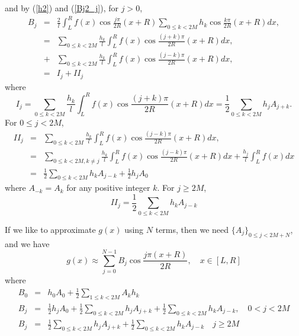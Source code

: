 \documentclass[numreferences]{kluwer}    %
\begin{document}
\begin{article}
and by (\ref{h2}) and (\ref{Bj2_j}), for $j>0$,
\begin{eqnarray}
B_j&=& \frac{2}l\int^{R}_L f(x)\cos\frac{j\pi}{2R}(x+R)  \sum_{0\le k<2M} h_k\cos \frac{k\pi}{2R}(x+R)   dx, \nonumber\\
&=& \sum_{0\le k<2M}  \frac{h_k}l\int^{R}_L f(x)\cos\frac{(j+k)\pi}{2R} (x+R)  dx, \nonumber\\
&+& \sum_{0\le k<2M}  \frac{h_k}l\int^{R}_L f(x)\cos\frac{(j-k)\pi}{2R} (x+R)  dx, \nonumber\\
&=& I_j + II_j
\end{eqnarray}
where
\begin{equation}
	I_j =\sum_{0\le k<2M}  \frac{h_k}l\int^{R}_L f(x)\cos\frac{(j+k)\pi}{2R} (x+R)  dx = \frac12\sum_{0\le k<2M} h_jA_{j+k}.
\end{equation}
For $0\le j<2M$, 
\begin{eqnarray}
	II_j &=& \sum_{0\le k<2M}  \frac{h_k}l\int^{R}_L f(x)\cos\frac{(j-k)\pi}{2R} (x+R)  dx, \nonumber\\
	&=& \sum_{0\le k<2M, k\neq j}  \frac{h_k}l\int^{R}_L f(x)\cos\frac{(j-k)\pi}{2R} (x+R)  dx + 
	\frac{h_j}l\int^{R}_L f(x) dx  \nonumber\\
	&=& \frac12 \sum_{0\le k<2M} h_kA_{j-k} + \frac12 h_jA_0 
\end{eqnarray}
 where $A_{-k}=A_k$ for any positive integer $k$. For $j\ge 2M$,
 \begin{equation}
 	II_j = \frac12 \sum_{0\le k<2M} h_kA_{j-k} 
 \end{equation}
 
If we like to approximate $g(x)$ using $N$ terms,  then we need $\{A_j\}_{0\le j <2M+N}$, and we have
\begin{equation}\label{g2}
	g(x)\approx  \sum_{j=0}^{N-1}B_j \cos\frac{j\pi(x+R)}{2R},
	\quad x\in [L,R]
\end{equation}
where
\begin{eqnarray}
	B_0 &=& h_0A_0 + \frac12\sum_{1\le k <2M}A_kh_k \nonumber\\
	B_j &=& \frac12 h_jA_0 + \frac12\sum_{0\le k<2M} h_jA_{j+k} + \frac12 \sum_{0\le k<2M} h_kA_{j-k}, \quad 0<j< 2M\nonumber\\
	B_j &=&  \frac12\sum_{0\le k<2M} h_jA_{j+k} + \frac12 \sum_{0\le k<2M} h_kA_{j-k} \quad j\ge 2M \label{g_coef}
\end{eqnarray}
 
%


\end{article}
\end{document}
